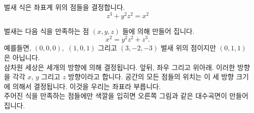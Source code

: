 \begin{surferPage}{벌새}
식은 좌표계 위의 점들을 결정합니다. \\
  
  \smallskip
\[z^3+ y^2	z^2	= x^2\]

\singlespacing
벌새는 다음 식을 만족하는 점 $(x, y, z)$ 들에 의해 만들어 집니다.
\smallskip
\[ x^2= y^2z^2+z^3.\]
\smallskip
예를들면, $(0,0,0),$ $(1,0,1)$ 그리고 $(3,-2,-3)$ 벌새 위의 점이지만 $(0,1,1)$ 은 아닙니다.\\
 \singlespacing
삼차원 세상은 세개의 방향에 의해 결정됩니다. 앞뒤, 좌우 그리고 위아래. 이러한 방향을 각각 $x$, $y$ 그리고 $z$ 방향이라고 합니다. 공간의 모든 점들의 위치는 이 세 방향 크기에 의해서 결정됩니다. 이것을 우리는 좌표라 부릅니다.\\
\singlespacing
주어진 식을 만족하는 점들에만 색깔을 입히면 오른쪽 그림과 같은 대수곡면이 만들어 집니다.
\end{surferPage}
